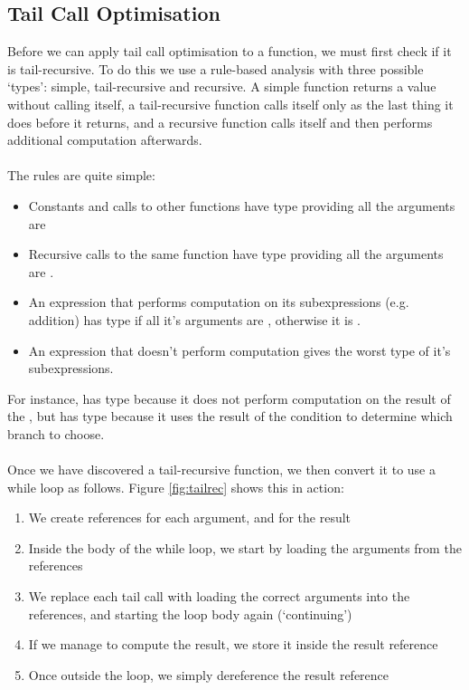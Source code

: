 \subsection{Tail Call Optimisation}
Before we can apply tail call optimisation to a function, we must first check if it is tail-recursive. To do this we use a rule-based analysis with three possible `types': simple, tail-recursive and recursive. A simple function returns a value without calling itself, a tail-recursive function calls itself only as the last thing it does before it returns, and a recursive function calls itself and then performs additional computation afterwards.
\\\\
The rules are quite simple:
\begin{itemize}
\item Constants and calls to other functions have type  providing all the arguments are 
\item Recursive calls to the same function have type  providing all the arguments are .
\item An expression that performs computation on its subexpressions (e.g. addition) has type  if all it's arguments are , otherwise it is .
\item An expression that doesn't perform computation gives the worst type of it's subexpressions.
\end{itemize}
For instance,  has type  because it does not perform computation on the result of the , but  has type  because it uses the result of the condition to determine which branch to choose.
\\\\
Once we have discovered a tail-recursive function, we then convert it to use a while loop as follows. Figure \ref{fig:tailrec} shows this in action:
\begin{enumerate}
\item We create references for each argument, and for the result
\item Inside the body of the while loop, we start by loading the arguments from the references
\item We replace each tail call with loading the correct arguments into the references, and starting the loop body again (`continuing')
\item If we manage to compute the result, we store it inside the result reference
\item Once outside the loop, we simply dereference the result reference
\end{enumerate}
